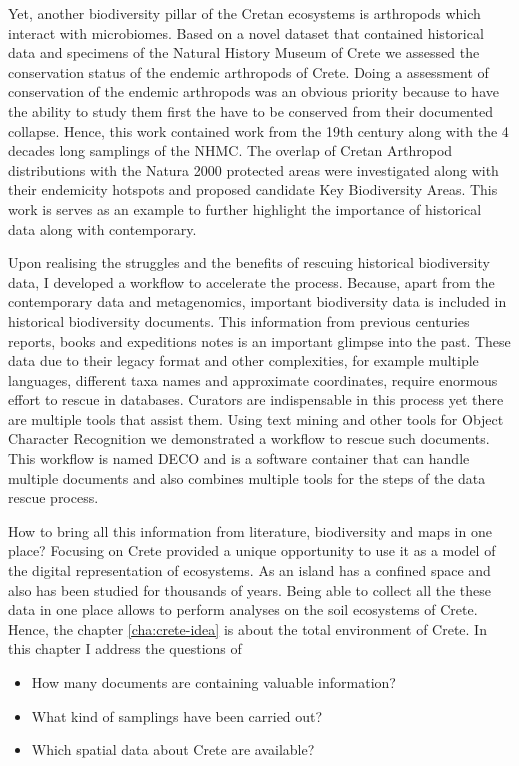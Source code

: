 \documentclass[
11pt, %
english, %
singlespacing, %
liststotoc, %
toctotoc, %
headsepline, %
]{MastersDoctoralThesis} %
\begin{document}
Yet, another biodiversity pillar of the Cretan ecosystems is arthropods which 
interact with microbiomes. Based on a novel dataset
that contained historical data and specimens of the Natural History Museum of Crete
we assessed the conservation status of the endemic arthropods of Crete. Doing a assessment of 
conservation of the endemic arthropods was an obvious priority because to have the ability to 
study them first the have to be conserved from their documented collapse. Hence, this work contained 
work from the 19th century along with the 4 decades long samplings of the NHMC. 
The overlap of Cretan Arthropod distributions with the Natura 2000 protected areas
were investigated along with their endemicity hotspots and proposed candidate Key Biodiversity Areas.
This work is serves as an example to further highlight the importance of historical data along with contemporary.

Upon realising the struggles and the benefits of rescuing historical biodiversity data, I
developed a workflow to accelerate the process. Because, apart from the contemporary data and metagenomics, important biodiversity data is 
included in historical biodiversity documents. This information from 
previous centuries reports, books and expeditions notes is an important glimpse into
the past. These data due to their legacy format and other complexities, for example 
multiple languages, different taxa names and approximate coordinates, require 
enormous effort to rescue in databases. Curators are indispensable in this process 
yet there are multiple tools that assist them. Using text mining and other tools 
for Object Character Recognition we demonstrated a workflow to rescue such documents.
This workflow is named DECO and is a software container that can handle multiple 
documents and also combines multiple tools for the steps of the data rescue process.

How to bring all this information from literature, biodiversity and maps in one place? Focusing on Crete
provided a unique opportunity to use it as a model of the digital representation of ecosystems. 
As an island has a confined space and also has been studied for thousands of years.
Being able to collect all the these data in one place allows to perform analyses on the soil ecosystems of Crete.
Hence, the chapter \ref{cha:crete-idea} is about the total environment of Crete.
In this chapter I address the questions of 
\begin{itemize}
    \item How many documents are containing valuable information?
    \item What kind of samplings have been carried out?
    \item Which spatial data about Crete are available? 
\end{itemize}
\end{document}
